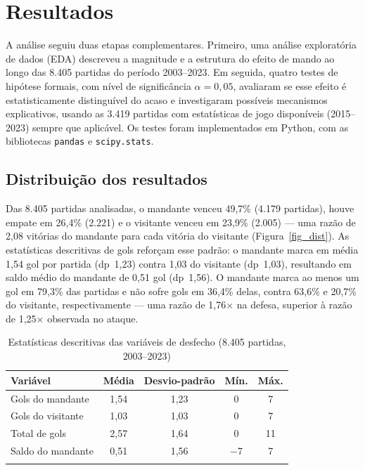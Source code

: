 \documentclass[pdflatex,sn-mathphys-num]{sn-jnl}%
\theoremstyle{thmstyleone}%
\theoremstyle{thmstyletwo}%
\theoremstyle{thmstylethree}%
\begin{document}
\section{Resultados}\label{sec2}

A análise seguiu duas etapas complementares. Primeiro, uma análise exploratória de dados (EDA) descreveu a magnitude e a estrutura do efeito de mando ao longo das 8.405 partidas do período 2003--2023. Em seguida, quatro testes de hipótese formais, com nível de significância $\alpha = 0{,}05$, avaliaram se esse efeito é estatisticamente distinguível do acaso e investigaram possíveis mecanismos explicativos, usando as 3.419 partidas com estatísticas de jogo disponíveis (2015--2023) sempre que aplicável. Os testes foram implementados em Python, com as bibliotecas \texttt{pandas} e \texttt{scipy.stats}.

\subsection{Distribuição dos resultados}\label{subsec_dist}

Das 8.405 partidas analisadas, o mandante venceu 49,7\% (4.179 partidas), houve empate em 26,4\% (2.221) e o visitante venceu em 23,9\% (2.005) --- uma razão de 2,08 vitórias do mandante para cada vitória do visitante (Figura~\ref{fig_dist}). As estatísticas descritivas de gols reforçam esse padrão: o mandante marca em média 1,54 gol por partida (dp~1,23) contra 1,03 do visitante (dp~1,03), resultando em saldo médio do mandante de 0,51 gol (dp~1,56). O mandante marca ao menos um gol em 79,3\% das partidas e não sofre gols em 36,4\% delas, contra 63,6\% e 20,7\% do visitante, respectivamente --- uma razão de 1,76$\times$ na defesa, superior à razão de 1,25$\times$ observada no ataque.

\begin{table}[h]
\caption{Estatísticas descritivas das variáveis de desfecho (8.405 partidas, 2003--2023)}\label{tab_desc}
\begin{tabular}{@{}lcccc@{}}
\toprule
Variável & Média & Desvio-padrão & Mín. & Máx.\\
\midrule
Gols do mandante   & 1,54 & 1,23 & 0 & 7\\
Gols do visitante  & 1,03 & 1,03 & 0 & 7\\
Total de gols       & 2,57 & 1,64 & 0 & 11\\
Saldo do mandante   & 0,51 & 1,56 & $-$7 & 7\\
\botrule
\end{tabular}
\end{table}
\end{document}
